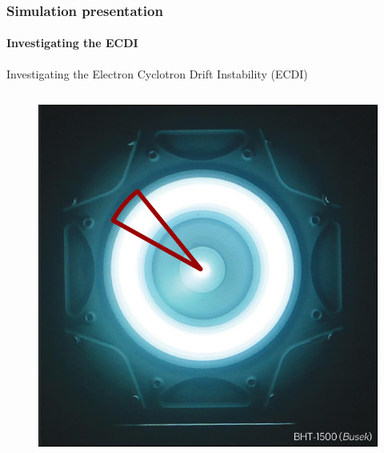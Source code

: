 \documentclass[sans, aspectratio=169]{beamer}
\begin{document}
\begin{frame}
\begin{columns}
\begin{column}{0.45\linewidth}
	\end{column}

\end{columns}	

\end{frame}

\begin{frame} 
	\frametitle{Simulation presentation} 
	\framesubtitle{ Investigating the ECDI } 
	Investigating the Electron Cyclotron Drift Instability (ECDI)
	
	\begin{columns}

	\begin{column}{0.45\linewidth}
		\begin{figure}[hbtp]
		\centering
		\includegraphics[scale=0.25]{images/Simulationcut.png}
	\end{figure}
	
	\end{column}


\end{columns}
\end{frame}
\end{document}
